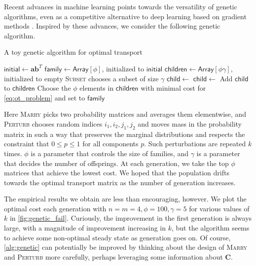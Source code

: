 \documentclass{article}
\renewcommand{\b}{\mathbf}
\theoremstyle{definition}
\theoremstyle{remark}
\begin{document}
Recent advances in machine learning points towards the versatility of genetic
 algorithms, even as a competitive alternative to deep learning based on
 gradient methods \cite{such2017deep}. Inspired by these advances, we consider
 the following genetic algorithm.

\begin{algorithm}
\caption{A toy genetic algorithm for optimal transport}
\label{alg:genetic}

  \begin{algorithmic}
\Function{GeneticOT}{$\phi, \gamma, k, \b a, \b b, T$}
\State $\mathsf{initial} \gets \b a \b b^T$
\State $\mathsf{family} \gets \mathsf{Array}[\phi]$, initialized to $
\mathsf{initial}$
\State $\mathsf{children} \gets \mathsf{Array}[\phi\gamma]$, initialized to
 empty
       \Comment
{\textsc{Subset} chooses a subset of size $\gamma$}
\State $\mathsf{child} \gets$ 
\State $\mathsf{child} \gets$ 
\State Add $\mathsf{child}$ to $\mathsf{children}$
\EndFor
\EndFor
\State Choose the $\phi$ elements in $\mathsf{children}$ with minimal cost for
 \eqref{eq:ot_problem} and set to $\mathsf{family}$
\EndFor
\State{}
\EndFunction
  \end{algorithmic}
\end{algorithm}
Here \textsc{Marry} picks two probability matrices and averages them
 elementwise, and \textsc{Perturb} chooses random indices $i_1,i_2, j_1,j_2$ and
 moves mass in the probability matrix in such a way that preserves the marginal
 distributions and respects the constraint that $0\le p \le 1$ for all
 components $p$. Such perturbations are repeated $k$ times. $\phi$ is a
 parameter that controls the size of families, and $\gamma$ is a parameter that
 decides the number of offsprings. At each generation, we take the top $\phi$
 matrices that achieve the lowest cost. We hoped that the population drifts
 towards the optimal transport matrix as the number of generation increases.

The empirical results we obtain are less than encouraging, however. We plot the
 optimal cost each generation with $n = m = 4, \phi=100, \gamma =5$ for various
 values of $k$ in \cref{fig:genetic_fail}. Curiously, the improvement in the
 first generation is always large, with a magnitude of improvement increasing
 in $k$, but the algorithm seems to achieve some non-optimal steady state as
 generation goes on. Of course, \cref{alg:genetic} can potentially be improved
 by thinking about the design of \textsc{Marry} and \textsc{Perturb} more
 carefully, perhaps leveraging some information about $\b C$. 
\end{document}
